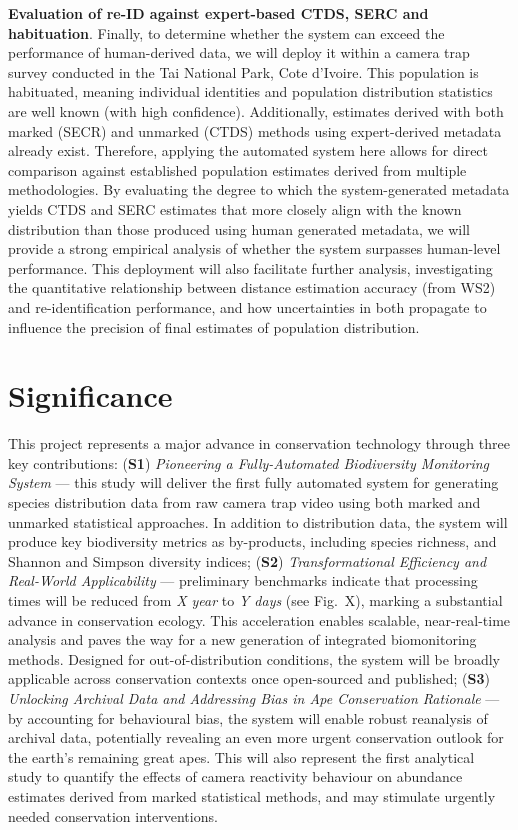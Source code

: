 \textbf{Evaluation of re-ID against expert-based CTDS, SERC and habituation}. Finally, to determine whether the system can exceed the performance of human-derived data, we will deploy it within a camera trap survey conducted in the Tai National Park, Cote d’Ivoire. This population is habituated,
meaning individual identities and population distribution statistics are well known (with high confidence). Additionally, estimates derived with both marked (SECR) and unmarked (CTDS) methods using expert-derived metadata already exist. Therefore, applying the automated system here allows for direct comparison against established population estimates derived from multiple methodologies. By evaluating the degree to which the system-generated metadata yields CTDS and SERC estimates that more closely align with the known distribution than those produced using human generated metadata, we will provide a strong empirical analysis of whether the system surpasses human-level performance. This deployment will also facilitate further analysis, investigating the quantitative relationship between distance estimation accuracy (from WS2) and re-identification performance, and how uncertainties in both propagate to influence the precision of final estimates of population distribution.

\section{Significance}

This project represents a major advance in conservation technology through three key contributions:
(\textbf{S1}) \textit{Pioneering a Fully-Automated Biodiversity Monitoring System} — this study will deliver the first fully automated system for generating species distribution data from raw camera trap video using both marked and unmarked statistical approaches. In addition to distribution data, the system will produce key biodiversity metrics as by-products, including species richness, and Shannon and Simpson diversity indices;
(\textbf{S2}) \textit{Transformational Efficiency and Real-World Applicability} — preliminary benchmarks indicate that processing times will be reduced from \textit{X year} to \textit{Y days} (see Fig.~X), marking a substantial advance in conservation ecology. This acceleration enables scalable, near-real-time analysis and paves the way for a new generation of integrated biomonitoring methods. Designed for out-of-distribution conditions, the system will be broadly applicable across conservation contexts once open-sourced and published;
(\textbf{S3}) \textit{Unlocking Archival Data and Addressing Bias in Ape Conservation Rationale} — by accounting for behavioural bias, the system will enable robust reanalysis of archival data, potentially revealing an even more urgent conservation outlook for the earth’s remaining great apes. This will also represent the first analytical study to quantify the effects of camera reactivity behaviour on abundance estimates derived from marked statistical methods, and may stimulate urgently needed conservation interventions.




